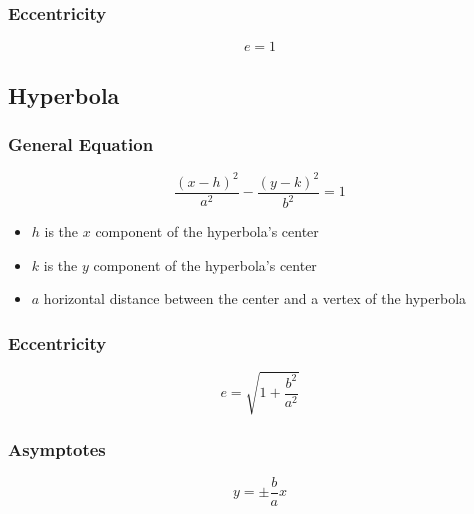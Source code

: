\documentclass[12pt]{article}
\begin{document}
\subsubsection{Eccentricity}
\begin{equation*}
    e = 1
\end{equation*}

\subsection{Hyperbola}
\subsubsection{General Equation}
\begin{equation*}
    \frac{(x - h)^2}{a^2} - \frac{(y - k)^2}{b^2} = 1
\end{equation*}
\begin{itemize}
    \item $h$ is the $x$ component of the hyperbola's center
    \item $k$ is the $y$ component of the hyperbola's center
    \item $a$ horizontal distance between the center and a vertex of the hyperbola
\end{itemize}

\subsubsection{Eccentricity}
\begin{equation*}
    e = \sqrt{1 + \frac{b^2}{a^2}}
\end{equation*}

\subsubsection{Asymptotes}
\begin{equation*}
    y = \pm \frac{b}{a}x
\end{equation*}
\end{document}
